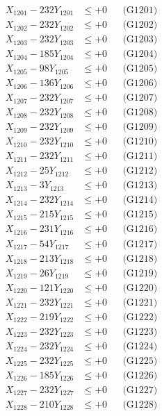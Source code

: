 \documentclass[a4paper,10pt]{article}
\begin{document}
{\begin{align}
\allowbreak
X_{1201} - 232Y_{1201} &\leq +0 && \text{(G1201)} \\
X_{1202} - 232Y_{1202} &\leq +0 && \text{(G1202)} \\
X_{1203} - 232Y_{1203} &\leq +0 && \text{(G1203)} \\
X_{1204} - 185Y_{1204} &\leq +0 && \text{(G1204)} \\
X_{1205} - 98Y_{1205} &\leq +0 && \text{(G1205)} \\
X_{1206} - 136Y_{1206} &\leq +0 && \text{(G1206)} \\
X_{1207} - 232Y_{1207} &\leq +0 && \text{(G1207)} \\
X_{1208} - 232Y_{1208} &\leq +0 && \text{(G1208)} \\
X_{1209} - 232Y_{1209} &\leq +0 && \text{(G1209)} \\
X_{1210} - 232Y_{1210} &\leq +0 && \text{(G1210)} \\
\allowbreak
X_{1211} - 232Y_{1211} &\leq +0 && \text{(G1211)} \\
X_{1212} - 25Y_{1212} &\leq +0 && \text{(G1212)} \\
X_{1213} - 3Y_{1213} &\leq +0 && \text{(G1213)} \\
X_{1214} - 232Y_{1214} &\leq +0 && \text{(G1214)} \\
X_{1215} - 215Y_{1215} &\leq +0 && \text{(G1215)} \\
X_{1216} - 231Y_{1216} &\leq +0 && \text{(G1216)} \\
X_{1217} - 54Y_{1217} &\leq +0 && \text{(G1217)} \\
X_{1218} - 213Y_{1218} &\leq +0 && \text{(G1218)} \\
X_{1219} - 26Y_{1219} &\leq +0 && \text{(G1219)} \\
X_{1220} - 121Y_{1220} &\leq +0 && \text{(G1220)} \\
\allowbreak
X_{1221} - 232Y_{1221} &\leq +0 && \text{(G1221)} \\
X_{1222} - 219Y_{1222} &\leq +0 && \text{(G1222)} \\
X_{1223} - 232Y_{1223} &\leq +0 && \text{(G1223)} \\
X_{1224} - 232Y_{1224} &\leq +0 && \text{(G1224)} \\
X_{1225} - 232Y_{1225} &\leq +0 && \text{(G1225)} \\
X_{1226} - 185Y_{1226} &\leq +0 && \text{(G1226)} \\
X_{1227} - 232Y_{1227} &\leq +0 && \text{(G1227)} \\
X_{1228} - 210Y_{1228} &\leq +0 && \text{(G1228)} \\

\end{align}}
\end{document}
